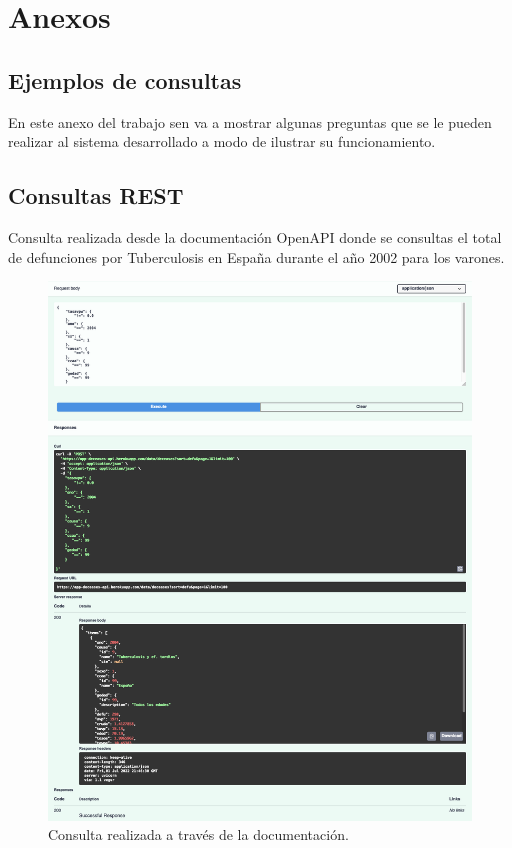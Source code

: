 \chapter{Anexos}

\section{Ejemplos de consultas} \label{sec:ejemplos}

En este anexo del trabajo sen va a mostrar algunas preguntas que se le pueden realizar al
sistema desarrollado a modo de ilustrar su
funcionamiento.

\section{Consultas REST}

Consulta realizada desde la documentación OpenAPI donde se consultas el total de defunciones
por Tuberculosis en España durante el año 2002 para los varones.
\FloatBarrier
\begin{figure}[h]
	\centering
	\includegraphics[width=\textwidth]{doc/logos/imgs/ejemplo1.png}
	\caption{ Consulta realizada a través de la documentación. }
\end{figure}
\FloatBarrier

